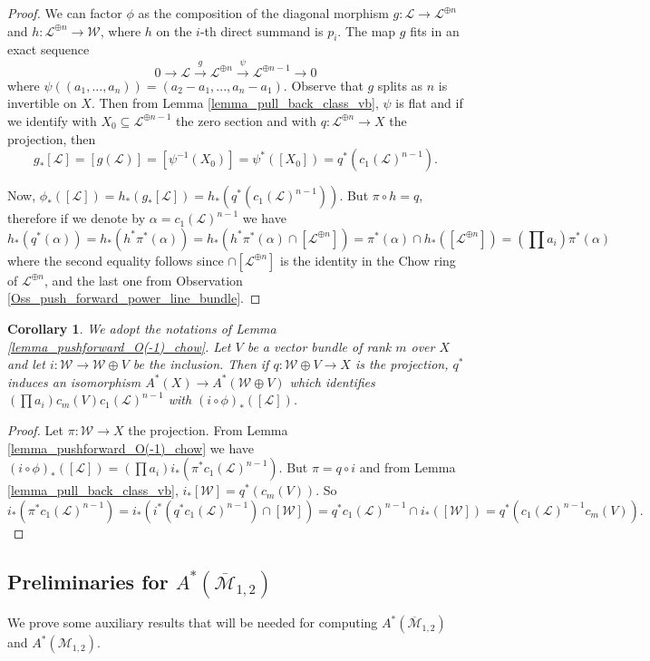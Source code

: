 \documentclass[11pt]{amsart}
\newtheorem{cor}[theorem]{Corollary}
\theoremstyle{definition}
\theoremstyle{remark}
\newcommand{\calM}{\mathcal M}
\newcommand{\calL}{\mathcal L}
\newcommand{\calW}{\mathcal W}
\begin{document}
\begin{proof}
We can factor $\phi$ as the composition of the diagonal morphism $g:\calL\to \calL^{\oplus n}$ and $h:\calL^{\oplus n} \to \calW$, where
$h$ on the $i$-th direct summand is $p_i$. 
The map $g$ fits in an exact sequence
$$0\to \calL\xrightarrow{g} \calL^{\oplus n}\xrightarrow{\psi} \calL^{\oplus n-1} \to 0 $$ where $\psi((a_1,...,a_n)) = (a_2-a_1,...,a_n - a_1)$. Observe that $g$ splits as $n$ is invertible on $X$. Then from Lemma \ref{lemma_pull_back_class_vb}, $\psi$ is flat and if we identify with $X_0\subseteq \calL^{\oplus n-1}$ the zero section and with $q:\calL^{\oplus n}\to X $ the projection, then $$g_*[\calL] = [g(\calL)] = [\psi^{-1}(X_0)] = \psi^*([X_0]) = q^*(c_1(\calL)^{n-1}).$$

Now, $\phi_*([\calL]) = h_*(g_*[\calL]) = h_*(q^*(c_1(\calL)^{n-1})).$ But $\pi\circ h = q$, therefore if we denote by $\alpha =c_1(\calL)^{n-1} $ we have  $$h_*(q^*(\alpha)) = h_*(h^*\pi^*(\alpha)) = h_*(h^*\pi^*(\alpha)\cap [\calL^{\oplus n}]) = \pi^*(\alpha)\cap h_*([\calL^{\oplus n}]) = \left(\prod a_i\right)\pi^*(\alpha)$$
where the second equality follows since $\cap[\calL^{\oplus n}]$ is the identity in the Chow ring of $\calL^{\oplus n}$, and the last one from Observation \ref{Oss_push_forward_power_line_bundle}.
\end{proof}
\begin{cor}\label{corollary_map_vector_bundles_in_chow}
We adopt the notations of Lemma \ref{lemma_pushforward_O(-1)_chow}. Let $V$ be a vector bundle of rank $m$ over $X$ and let $i:\calW \to \calW\oplus V$ be the inclusion. Then if $q:\calW\oplus V\to X$ is the projection, $q^*$ induces an isomorphism $A^*(X) \to A^*(\calW\oplus V)$ which identifies $\left(\prod a_i \right)c_m(V)c_1(\calL)^{n-1}$ with $(i\circ \phi)_*([\calL])$.
\end{cor}
\begin{proof} Let $\pi:\calW\to X$ the projection. From Lemma \ref{lemma_pushforward_O(-1)_chow} we have $(i\circ \phi)_*([\calL]) = \left(\prod a_i\right)i_*(\pi^*c_1(\calL)^{n-1})$. But $\pi = q\circ i$ and from Lemma \ref{lemma_pull_back_class_vb}, $i_*[\calW] = q^*(c_m(V))$. So$$ i_*(\pi^*c_1(\calL)^{n-1}) = i_*(i^*(q^*c_1(\calL)^{n-1})\cap [\calW]) =  q^*c_1(\calL)^{n-1}\cap i_*([\calW]) = q^*(c_1(\calL)^{n-1}c_m(V)). $$\end{proof}
\subsection{Preliminaries for $A^*(\overline{\calM}_{1,2})$} We prove some auxiliary results that will be needed for computing $A^*(\overline{\calM}_{1,2})$ and $A^*(\calM_{1,2})$.
\end{document}
